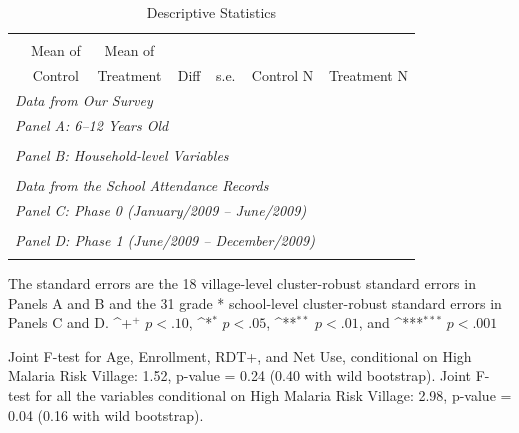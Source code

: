 \documentclass[fleqn,11pt]{article}
\newcommand{\sym}[1]{\rlap{$#1$}}
\def\sym#1{\ifmmode^{#1}\else\(^{#1}\)\fi
}
\begin{document}
\begin{table}[h]
\caption{Descriptive Statistics}

\begin{adjustbox}{max width=\textwidth}
\begin{threeparttable}
\label{descriptive_merge_child}\centering
\begin{tabular}{l*{1}{cccccc}}
\hline\hline\\
		&Mean of& Mean of&&&&\\
	&   Control&    Treatment&        Diff&        s.e.& Control N&  Treatment N\\
              \multicolumn{6}{l}{\it Data from Our Survey}        \\ \hline
              \multicolumn{6}{l}{\it Panel A:  6--12 Years Old}        \\

\hline 
 \\
\multicolumn{6}{l}{{\it Panel B: Household-level Variables}} \\
\hline  \\
              \multicolumn{6}{l}{\it Data from the School Attendance Records}        \\ 
\hline
              \multicolumn{6}{l}{\it Panel C: Phase 0 (January/2009 -- June/2009)}   \\
              \hline
               \\
              \multicolumn{6}{l}{\it Panel D: Phase 1 (June/2009 -- December/2009)}   \\
              \hline
               \\ \hline \hline
\end{tabular}
\begin{tablenotes}
\item The standard errors are the 18 village-level cluster-robust standard errors in Panels A and B and the 31 grade * school-level cluster-robust standard errors in Panels C and D.  \sym{+} \(p<.10\), \sym{*} \(p<.05\), \sym{**} \(p<.01\), and \sym{***} \(p<.001\)
\item Joint F-test for Age, Enrollment,  RDT+, and Net Use, conditional on High Malaria Risk Village:  1.52, p-value = 0.24 (0.40 with wild bootstrap). Joint F-test for all the variables conditional on High Malaria Risk Village: 2.98, p-value = 0.04 (0.16 with wild bootstrap).
\end{tablenotes}
\end{threeparttable}
\end{adjustbox}
\end{table}
\end{document}
